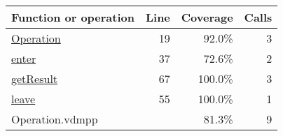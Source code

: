 \bigskip
\begin{longtable}{|l|r|r|r|}
\hline
Function or operation & Line & Coverage & Calls \\
\hline
\hline
\hyperref[Operation:19]{Operation} & 19&92.0\% & 3 \\
\hline
\hyperref[enter:37]{enter} & 37&72.6\% & 2 \\
\hline
\hyperref[getResult:67]{getResult} & 67&100.0\% & 3 \\
\hline
\hyperref[leave:55]{leave} & 55&100.0\% & 1 \\
\hline
\hline
Operation.vdmpp & & 81.3\% & 9 \\
\hline
\end{longtable}

